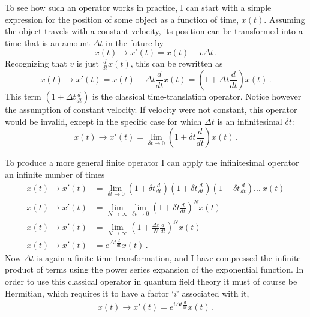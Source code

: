     To see how such an operator works in practice,
        I can start with a simple expression for the position of some object as a function of time, $x(t)$.
    Assuming the object travels with a constant velocity,
        its position can be transformed into a time that is an amount $\Delta t$ in the future by
    \begin{equation}
        x(t) \to x'(t) = x(t) + v \Delta t
        \,.
    \end{equation}
    Recognizing that $v$ is just $\frac{d}{dt} x(t)$, this can be rewritten as
    \begin{equation}
        x(t) \to x'(t) = x(t) + \Delta t \frac{d}{dt} x(t) = \left(1+\Delta t \frac{d}{dt}\right) x(t)
        \,.
    \end{equation}
    This term $\left(1+\Delta t \frac{d}{dt}\right)$ is the classical time-translation operator.
    Notice however the assumption of constant velocity.
    If velocity were not constant, this operator would be invalid,
        except in the specific case for which $\Delta t$ is an infinitesimal $\delta t$:
    \begin{equation}
        x(t) \to x'(t) = \lim_{\delta t \to 0} \left(1+\delta t \frac{d}{dt}\right) x(t)
        \,.
    \end{equation}

    To produce a more general finite operator I can apply the infinitesimal operator an infinite number of times
    \begin{equation} \begin{split}
        x(t) \to x'(t) &= \lim_{\delta t \to 0} \left(1+\delta t \frac{d}{dt}\right)\left(1+\delta t \frac{d}{dt}\right)\left(1+\delta t \frac{d}{dt}\right)...\ x(t)
        \\x(t) \to x'(t) &= \lim_{N \to \infty} \lim_{\delta t \to 0} \left(1+\delta t \frac{d}{dt}\right)^N x(t)
        \\x(t) \to x'(t) &= \lim_{N \to \infty} \left(1+\frac{\Delta t}{N} \frac{d}{dt}\right)^N x(t)
        \\x(t) \to x'(t) &= e^{\Delta t \frac{d}{dt}} x(t)
        \,.
    \end{split} \end{equation}
    Now $\Delta t$ is again a finite time transformation,
        and I have compressed the infinite product of terms using the power series expansion of the exponential function.
    In order to use this classical operator in quantum field theory it must of course be Hermitian,
        which requires it to have a factor `$i$' associated with it,
    \begin{equation} \begin{split}
        x(t) \to x'(t) = e^{i\Delta t \frac{d}{dt}} x(t)
        \,.
    \end{split} \end{equation}

